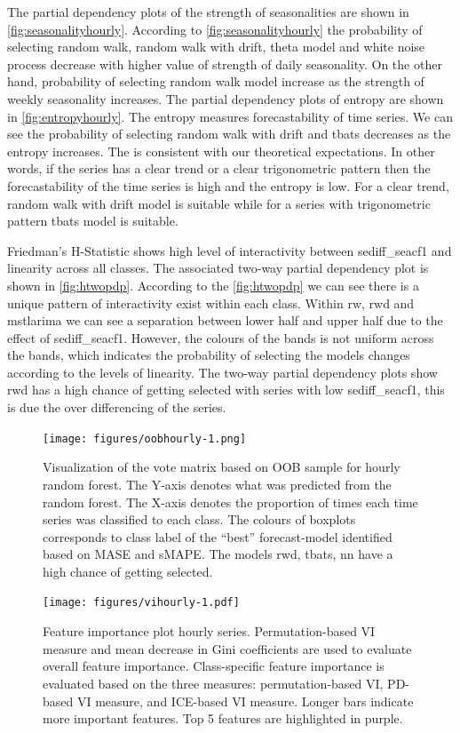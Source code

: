 \documentclass[11pt,a4paper,]{article}
\begin{document}
The partial dependency plots of the strength of seasonalities are shown in \autoref{fig:seasonalityhourly}. According to \autoref{fig:seasonalityhourly} the probability of selecting random walk, random walk with drift, theta model and white noise process decrease with higher value of strength of daily seasonality. On the other hand, probability of selecting random walk model increase as the strength of weekly seasonality increases. The partial dependency plots of entropy are shown in \autoref{fig:entropyhourly}. The entropy measures forecastability of time series. We can see the probability of selecting random walk with drift and tbats decreases as the entropy increases. The is consistent with our theoretical expectations. In other words, if the series has a clear trend or a clear trigonometric pattern then the forecastability of the time series is high and the entropy is low. For a clear trend, random walk with drift model is suitable while for a series with trigonometric pattern tbats model is suitable.

Friedman's H-Statistic shows high level of interactivity between sediff\_seacf1 and linearity across all classes. The associated two-way partial dependency plot is shown in \autoref{fig:htwopdp}. According to the \autoref{fig:htwopdp} we can see there is a unique pattern of interactivity exist within each class. Within rw, rwd and mstlarima we can see a separation between lower half and upper half due to the effect of sediff\_seacf1. However, the colours of the bands is not uniform across the bands, which indicates the probability of selecting the models changes according to the levels of linearity. The two-way partial dependency plots show rwd has a high chance of getting selected with series with low sediff\_seacf1, this is due the over differencing of the series.

\begin{figure}
\centering
\texttt{[image: figures/oobhourly-1.png]}
\caption{\label{fig:oobhourly}Visualization of the vote matrix based on OOB sample for hourly random forest. The Y-axis denotes what was predicted from the random forest. The X-axis denotes the proportion of times each time series was classified to each class. The colours of boxplots corresponds to class label of the ``best'' forecast-model identified based on MASE and sMAPE. The models rwd, tbats, nn have a high chance of getting selected.}
\end{figure}

\begin{figure}
\centering
\texttt{[image: figures/vihourly-1.pdf]}
\caption{\label{fig:vihourly}Feature importance plot hourly series. Permutation-based VI measure and mean decrease in Gini coefficients are used to evaluate overall feature importance. Class-specific feature importance is evaluated based on the three measures: permutation-based VI, PD-based VI measure, and ICE-based VI measure. Longer bars indicate more important features. Top 5 features are highlighted in purple.}
\end{figure}
\end{document}
